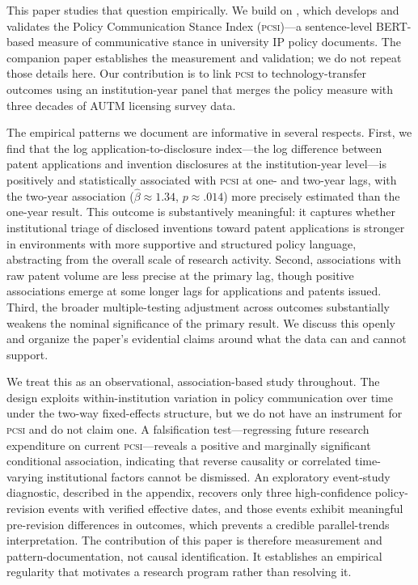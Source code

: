 \documentclass[12pt]{article}
\newcommand{\PCSI}{\textsc{pcsi}}
\begin{document}
This paper studies that question empirically. We build on \citet{sharma2026pcsi}, which
develops and validates the Policy Communication Stance Index (\PCSI{})---a sentence-level
BERT-based measure of communicative stance in university IP policy documents. The
companion paper establishes the measurement and validation; we do not repeat those
details here. Our contribution is to link \PCSI{} to technology-transfer outcomes using
an institution-year panel that merges the policy measure with three decades of AUTM
licensing survey data.

The empirical patterns we document are informative in several respects. First, we
find that the log application-to-disclosure index---the log difference between patent
applications and invention disclosures at the institution-year level---is positively and
statistically associated with \PCSI{} at one- and two-year lags, with the two-year
association ($\hat\beta \approx 1.34$, $p \approx .014$) more precisely estimated than
the one-year result. This outcome is substantively meaningful: it captures whether
institutional triage of disclosed inventions toward patent applications is stronger in
environments with more supportive and structured policy language, abstracting from the
overall scale of research activity. Second, associations with raw patent volume are less
precise at the primary lag, though positive associations emerge at some longer lags for
applications and patents issued. Third, the broader multiple-testing adjustment across
outcomes substantially weakens the nominal significance of the primary result. We discuss
this openly and organize the paper's evidential claims around what the data can and
cannot support.

We treat this as an observational, association-based study throughout. The design
exploits within-institution variation in policy communication over time under the
two-way fixed-effects structure, but we do not have an instrument for \PCSI{} and
do not claim one. A falsification test---regressing future research expenditure on
current \PCSI{}---reveals a positive and marginally significant conditional
association, indicating that reverse causality or correlated time-varying institutional
factors cannot be dismissed. An exploratory event-study diagnostic, described in the
appendix, recovers only three high-confidence policy-revision events with verified
effective dates, and those events exhibit meaningful pre-revision differences in outcomes,
which prevents a credible parallel-trends interpretation. The contribution of this paper
is therefore measurement and pattern-documentation, not causal identification. It
establishes an empirical regularity that motivates a research program rather than
resolving it.
\end{document}
